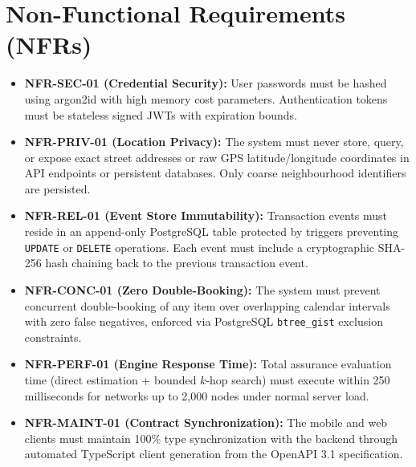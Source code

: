 \section{Non-Functional Requirements (NFRs)}
\begin{itemize}
    \item \textbf{NFR-SEC-01 (Credential Security):} User passwords must be hashed using argon2id with high memory cost parameters. Authentication tokens must be stateless signed JWTs with expiration bounds.
    \item \textbf{NFR-PRIV-01 (Location Privacy):} The system must never store, query, or expose exact street addresses or raw GPS latitude/longitude coordinates in API endpoints or persistent databases. Only coarse neighbourhood identifiers are persisted.
    \item \textbf{NFR-REL-01 (Event Store Immutability):} Transaction events must reside in an append-only PostgreSQL table protected by triggers preventing \texttt{UPDATE} or \texttt{DELETE} operations. Each event must include a cryptographic SHA-256 hash chaining back to the previous transaction event.
    \item \textbf{NFR-CONC-01 (Zero Double-Booking):} The system must prevent concurrent double-booking of any item over overlapping calendar intervals with zero false negatives, enforced via PostgreSQL \texttt{btree\_gist} exclusion constraints.
    \item \textbf{NFR-PERF-01 (Engine Response Time):} Total assurance evaluation time (direct estimation + bounded $k$-hop search) must execute within 250 milliseconds for networks up to 2,000 nodes under normal server load.
    \item \textbf{NFR-MAINT-01 (Contract Synchronization):} The mobile and web clients must maintain 100\% type synchronization with the backend through automated TypeScript client generation from the OpenAPI 3.1 specification.
\end{itemize}
